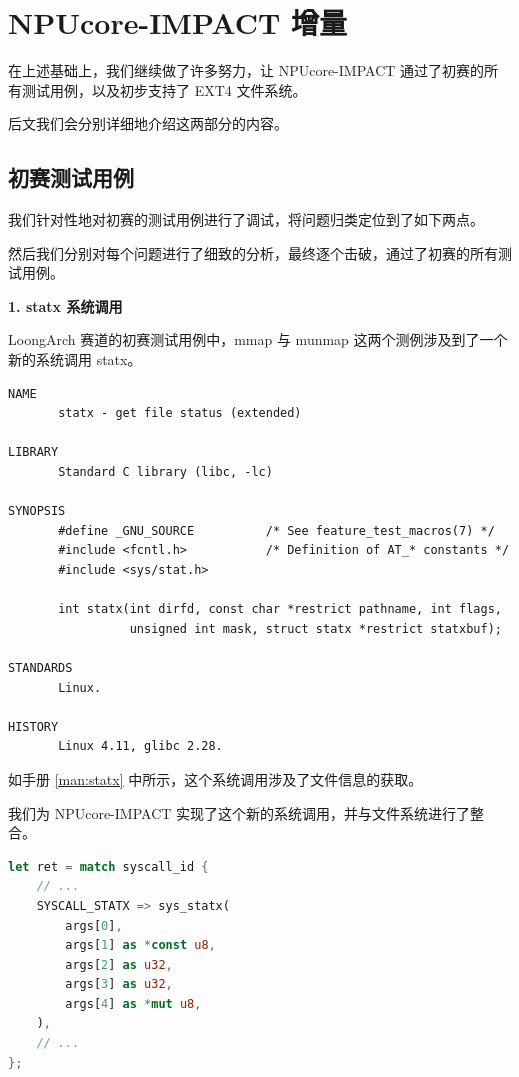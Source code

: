 \chapter{NPUcore-IMPACT 增量}

在上述基础上，我们继续做了许多努力，让 NPUcore-IMPACT 通过了初赛的所有测试用例，以及初步支持了 EXT4 文件系统。

后文我们会分别详细地介绍这两部分的内容。

\section{初赛测试用例}

我们针对性地对初赛的测试用例进行了调试，将问题归类定位到了如下两点。

然后我们分别对每个问题进行了细致的分析，最终逐个击破，通过了初赛的所有测试用例。

\textbf{1. statx 系统调用}

LoongArch 赛道的初赛测试用例中，mmap 与 munmap 这两个测例涉及到了一个新的系统调用 statx。

\begin{lstlisting}[label={man:statx}, caption={statx 手册}]
NAME
       statx - get file status (extended)

LIBRARY
       Standard C library (libc, -lc)

SYNOPSIS
       #define _GNU_SOURCE          /* See feature_test_macros(7) */
       #include <fcntl.h>           /* Definition of AT_* constants */
       #include <sys/stat.h>

       int statx(int dirfd, const char *restrict pathname, int flags,
                 unsigned int mask, struct statx *restrict statxbuf);

STANDARDS
       Linux.

HISTORY
       Linux 4.11, glibc 2.28.
\end{lstlisting}

如手册 \ref{man:statx} 中所示，这个系统调用涉及了文件信息的获取。

我们为 NPUcore-IMPACT 实现了这个新的系统调用，并与文件系统进行了整合。

\begin{lstlisting}[language={Rust}, caption={statx 系统调用入口}]
let ret = match syscall_id {
    // ...
    SYSCALL_STATX => sys_statx(
        args[0],
        args[1] as *const u8,
        args[2] as u32,
        args[3] as u32,
        args[4] as *mut u8,
    ),
    // ...
};
\end{lstlisting}

